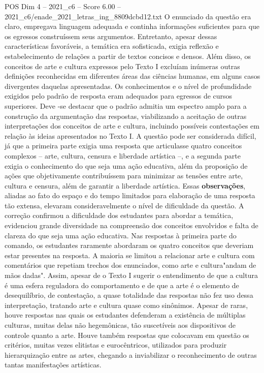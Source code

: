\begin{textsample}{POS Dim 4 – 2021\_c6 – Score 6.00 – 2021\_c6/enade\_2021\_letras\_ing\_8809dcbd12.txt}
O enunciado da questão era claro, empregava linguagem adequada e continha informações suficientes para que os egressos construíssem seus argumentos.
Entretanto, apesar dessas características favoráveis, a temática era sofisticada, exigia reflexão e estabelecimento de relações a partir de textos concisos e densos.
Além disso, os conceitos de arte e cultura expressos pelo Texto I excluíam inúmeras outras definições reconhecidas em diferentes áreas das ciências humanas, em alguns casos divergentes daquelas apresentadas.
Os conhecimentos e o nível de profundidade exigidos pelo padrão de resposta eram adequados para egressos de cursos superiores.
Deve -se destacar que o padrão admitia um espectro amplo para a construção da argumentação das respostas, viabilizando a aceitação de outras interpretações dos conceitos de arte e cultura, incluindo possíveis contestações em relação às ideias apresentados no Texto I.
A questão pode ser considerada difícil, já que a primeira parte exigia uma resposta que articulasse quatro conceitos complexos – arte, cultura, censura e liberdade artística –, e a segunda parte exigia o conhecimento do que seja uma ação educativa, além da proposição de ações que objetivamente contribuíssem para minimizar as tensões entre arte, cultura e censura, além de garantir a liberdade artística.
Essas \textbf{observações}, aliadas ao fato do espaço e do tempo limitados para elaboração de uma resposta tão extensa, elevaram consideravelmente o nível de dificuldade da questão.
A correção confirmou a dificuldade dos estudantes para abordar a temática, evidenciou grande diversidade na compreensão dos conceitos envolvidos e falta de clareza do que seja uma ação educativa.
Nas respostas à primeira parte do comando, os estudantes raramente abordaram os quatro conceitos que deveriam estar presentes na resposta.
A maioria se limitou a relacionar arte e cultura com comentários que repetiam trechos dos enunciados, como arte e cultura"andam de mãos dadas".
Assim, apesar de o Texto I sugerir o entendimento de que a cultura é uma esfera reguladora do comportamento e de que a arte é o elemento de desequilíbrio, de contestação, a quase totalidade das respostas não fez uso dessa interpretação, tratando arte e cultura quase como sinônimos.
Apesar de raras, houve respostas nas quais os estudantes defenderam a existência de múltiplas culturas, muitas delas não hegemônicas, tão suscetíveis aos dispositivos de controle quanto a arte.
Houve também respostas que colocavam em questão os critérios, muitas vezes elitistas e eurocêntricos, utilizados para produzir hierarquização entre as artes, chegando a inviabilizar o reconhecimento de outras tantas manifestações artísticas.

\end{textsample}
